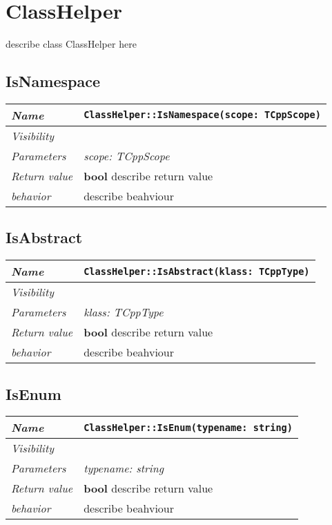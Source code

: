  \chapter{ClassHelper}
describe class ClassHelper here
\section{IsNamespace}
\begin{longtable}{p{3cm} @{\hskip 1cm} p{12cm}}
 \hline
\textit{Name} & \texttt{ClassHelper::IsNamespace(scope: TCppScope)}\\
\hline
 \textit{Visibility} & \\
\hline
\textit{Parameters} & \textit{scope: TCppScope}\\
\hline
\textit{Return value} & \textbf{ bool} describe return value\\
  \hline
 \textit{behavior} & describe beahviour \\
\hline
\end{longtable} \pagebreak
 \section{IsAbstract}
\begin{longtable}{p{3cm} @{\hskip 1cm} p{12cm}}
 \hline
\textit{Name} & \texttt{ClassHelper::IsAbstract(klass: TCppType)}\\
\hline
 \textit{Visibility} & \\
\hline
\textit{Parameters} & \textit{klass: TCppType}\\
\hline
\textit{Return value} & \textbf{ bool} describe return value\\
  \hline
 \textit{behavior} & describe beahviour \\
\hline
\end{longtable} \pagebreak
 \section{IsEnum}
\begin{longtable}{p{3cm} @{\hskip 1cm} p{12cm}}
 \hline
\textit{Name} & \texttt{ClassHelper::IsEnum(typename: string)}\\
\hline
 \textit{Visibility} & \\
\hline
\textit{Parameters} & \textit{typename: string}\\
\hline
\textit{Return value} & \textbf{ bool} describe return value\\
  \hline
 \textit{behavior} & describe beahviour \\
\hline
\end{longtable} \pagebreak
